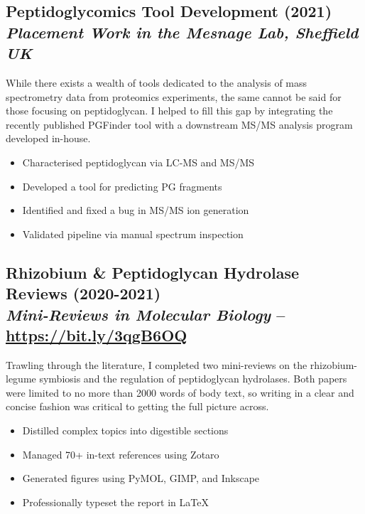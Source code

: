 \documentclass[twocolumn, a4paper, fontsize=9pt, headsepline, footsepline]{scrartcl}
\begin{document}
\subsection*{Peptidoglycomics Tool Development (2021)\\\textmd{\emph{Placement Work
    in the Mesnage Lab, Sheffield UK}}}
\noindent
While there exists a wealth of tools dedicated to the analysis of mass
spectrometry data from proteomics experiments, the same cannot be said for those
focusing on peptidoglycan. I helped to fill this gap by integrating the recently
published PGFinder tool with a downstream MS/MS analysis program developed
in-house.
\begin{itemize}
\item Characterised peptidoglycan via LC-MS and MS/MS
\item Developed a tool for predicting PG fragments
\item Identified and fixed a bug in MS/MS ion generation
\item Validated pipeline via manual spectrum inspection
\end{itemize}

\subsection*{Rhizobium \& Peptidoglycan Hydrolase Reviews
  (2020-2021)\\\textmd{\emph{Mini-Reviews in Molecular Biology} – \url{https://bit.ly/3qgB6OQ}}}
\noindent
Trawling through the literature, I completed two mini-reviews on the
rhizobium-legume symbiosis and the regulation of peptidoglycan hydrolases. Both
papers were limited to no more than 2000 words of body text, so writing in a
clear and concise fashion was critical to getting the full picture across.
\begin{itemize}
\item Distilled complex topics into digestible sections
\item Managed 70+ in-text references using Zotaro
\item Generated figures using PyMOL, GIMP, and Inkscape
\item Professionally typeset the report in \LaTeX
\end{itemize}
\end{document}
